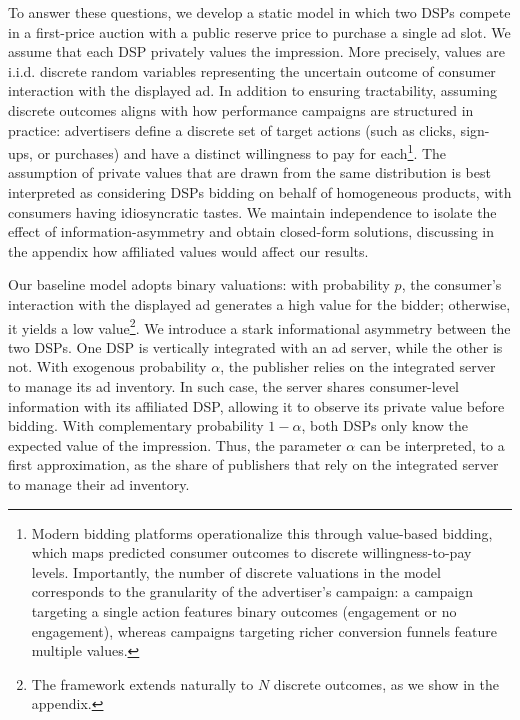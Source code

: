 To answer these questions, we develop a static model in which two DSPs compete in a first-price auction with a public reserve price to purchase a single ad slot. We assume that each DSP privately values the impression. More precisely, values are i.i.d. discrete random variables representing the uncertain outcome of consumer interaction with the displayed ad. In addition to ensuring tractability, assuming discrete outcomes aligns with how performance campaigns are structured in practice: advertisers define a discrete set of target actions (such as clicks, sign-ups, or purchases) and have a distinct willingness to pay for each\footnote{Modern bidding platforms operationalize this through value-based bidding, which maps predicted consumer outcomes to discrete willingness-to-pay levels. Importantly, the number of discrete valuations in the model corresponds to the granularity of the advertiser's campaign: a campaign targeting a single action features binary outcomes (engagement or no engagement), whereas campaigns targeting richer conversion funnels feature multiple values.}. The assumption of private values that are drawn from the same distribution is best interpreted as considering DSPs bidding on behalf of homogeneous products, with consumers having idiosyncratic tastes. We maintain independence to isolate the effect of information-asymmetry and obtain closed-form solutions, discussing in the appendix how affiliated values would affect our results.

Our baseline model adopts binary valuations: with probability $ p $, the consumer's interaction with the displayed ad generates a high value for the bidder; otherwise, it yields a low value\footnote{The framework extends naturally to $ N $ discrete outcomes, as we show in the appendix.}. We introduce a stark informational asymmetry between the two DSPs. One DSP is vertically integrated with an ad server, while the other is not. With exogenous probability $ \alpha $, the publisher relies on the integrated server to manage its ad inventory. In such case, the server shares consumer-level information with its affiliated DSP, allowing it to observe its private value before bidding. With complementary probability $ 1-\alpha $, both DSPs only know the expected value of the impression. Thus, the parameter $ \alpha $ can be interpreted, to a first approximation, as the share of publishers that rely on the integrated server to manage their ad inventory.

